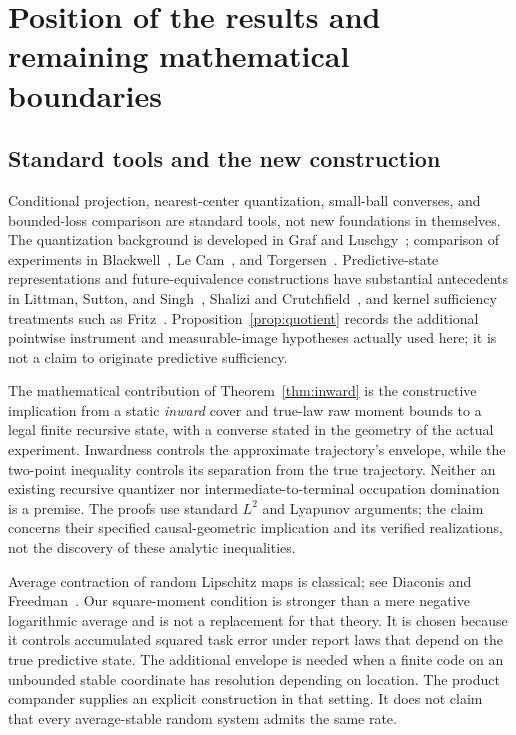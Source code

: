 \section{Position of the results and remaining mathematical boundaries}\label{sec:comparison}
\subsection{Standard tools and the new construction}
Conditional projection, nearest-center quantization, small-ball converses, and bounded-loss comparison are standard tools, not new foundations in themselves. The quantization background is developed in Graf and Luschgy~\cite{graf}; comparison of experiments in Blackwell~\cite{blackwell}, Le Cam~\cite{lecam}, and Torgersen~\cite{torgersen}. Predictive-state representations and future-equivalence constructions have substantial antecedents in Littman, Sutton, and Singh~\cite{psr}, Shalizi and Crutchfield~\cite{shalizi}, and kernel sufficiency treatments such as Fritz~\cite{fritz}. Proposition~\ref{prop:quotient} records the additional pointwise instrument and measurable-image hypotheses actually used here; it is not a claim to originate predictive sufficiency.

The mathematical contribution of Theorem~\ref{thm:inward} is the constructive implication from a static \emph{inward} cover and true-law raw moment bounds to a legal finite recursive state, with a converse stated in the geometry of the actual experiment. Inwardness controls the approximate trajectory's envelope, while the two-point inequality controls its separation from the true trajectory. Neither an existing recursive quantizer nor intermediate-to-terminal occupation domination is a premise. The proofs use standard $L^2$ and Lyapunov arguments; the claim concerns their specified causal-geometric implication and its verified realizations, not the discovery of these analytic inequalities.

Average contraction of random Lipschitz maps is classical; see Diaconis and Freedman~\cite{diaconis}. Our square-moment condition is stronger than a mere negative logarithmic average and is not a replacement for that theory. It is chosen because it controls accumulated squared task error under report laws that depend on the true predictive state. The additional envelope is needed when a finite code on an unbounded stable coordinate has resolution depending on location. The product compander supplies an explicit construction in that setting. It does not claim that every average-stable random system admits the same rate.

